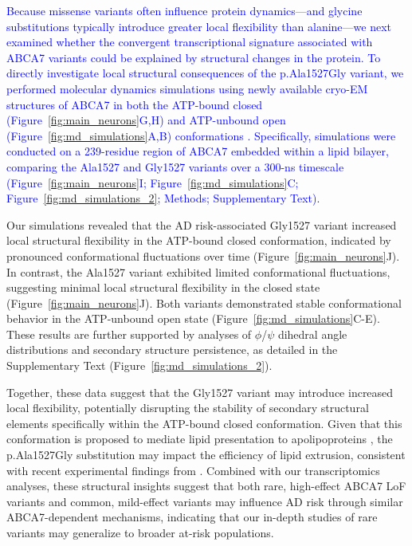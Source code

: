 \documentclass[12pt]{article}
\begin{document}
\newcommand{\quoteP}{\textcolor{blue}{Because missense variants often influence protein dynamics—and glycine substitutions typically introduce greater local flexibility than alanine—we next examined whether the convergent transcriptional signature associated with ABCA7 variants could be explained by structural changes in the protein. To directly investigate local structural consequences of the p.Ala1527Gly variant, we performed molecular dynamics simulations using newly available cryo-EM structures of ABCA7 in both the ATP-bound closed (Figure~\ref{fig:main_neurons}G,H) and ATP-unbound open (Figure~\ref{fig:md_simulations}A,B) conformations \cite{LeThiMy2022-dp,Jumper2021-na}. Specifically, simulations were conducted on a 239-residue region of ABCA7 embedded within a lipid bilayer, comparing the Ala1527 and Gly1527 variants over a 300-ns timescale (Figure~\ref{fig:main_neurons}I; Figure~\ref{fig:md_simulations}C; Figure~\ref{fig:md_simulations_2}; Methods; Supplementary Text).\label{quoteL-labelP}}}\quoteP

Our simulations revealed that the AD risk-associated Gly1527 variant increased local structural flexibility in the ATP-bound closed conformation, indicated by pronounced conformational fluctuations over time (Figure~\ref{fig:main_neurons}J). In contrast, the Ala1527 variant exhibited limited conformational fluctuations, suggesting minimal local structural flexibility in the closed state (Figure~\ref{fig:main_neurons}J). Both variants demonstrated stable conformational behavior in the ATP-unbound open state (Figure~\ref{fig:md_simulations}C-E). These results are further supported by analyses of $\phi$/$\psi$ dihedral angle distributions and secondary structure persistence, as detailed in the Supplementary Text (Figure~\ref{fig:md_simulations_2}).

Together, these data suggest that the Gly1527 variant may introduce increased local flexibility, potentially disrupting the stability of secondary structural elements specifically within the ATP-bound closed conformation. Given that this conformation is proposed to mediate lipid presentation to apolipoproteins \cite{LeThiMy2022-dp,Fang2025}, the p.Ala1527Gly substitution may impact the efficiency of lipid extrusion, consistent with recent experimental findings from \cite{Fang2025}. Combined with our transcriptomics analyses, these structural insights suggest that both rare, high-effect ABCA7 LoF variants and common, mild-effect variants may influence AD risk through similar ABCA7-dependent mechanisms, indicating that our in-depth studies of rare variants may generalize to broader at-risk populations.
\end{document}
